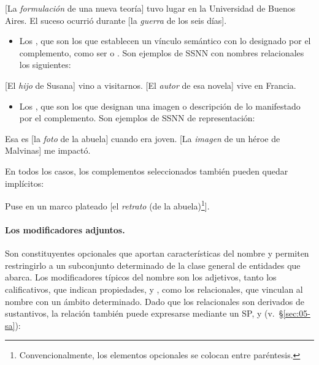 \begin{exe}
  \ex\label{ex:05-lugar} {}[La \textit{formulación} de una nueva teoría] tuvo
      lugar en la Universidad de Buenos Aires.
  \ex\label{ex:05-durante} El suceso ocurrió durante [la \textit{guerra} de los
      seis días].
\end{exe}

\begin{itemize}
  \item Los , que son los que establecen un vínculo
        semántico con lo designado por el complemento, como ser  o . Son ejemplos de SSNN con nombres relacionales los
        siguientes:
\end{itemize}

\begin{exe}
  \ex {}[El \textit{hijo} de Susana] vino a visitarnos.
  \ex {}[El \textit{autor} de esa novela] vive en Francia.
\end{exe}

\begin{itemize}
  \item Los , que son los que designan una
        imagen o descripción de lo manifestado por el complemento. Son ejemplos
        de SSNN de representación:
\end{itemize}

\begin{exe}
  \ex Esa es [la \textit{foto} de la abuela] cuando era joven.
  \ex {}[La \textit{imagen} de un héroe de Malvinas] me impactó.
\end{exe}

En todos los casos, los complementos seleccionados también pueden quedar
implícitos:

\begin{exe}
  \ex Puse en un marco plateado [el \textit{retrato} (de la
      abuela)\footnote{Convencionalmente, los elementos opcionales se colocan
      entre paréntesis.}].
\end{exe}

\paragraph{Los modificadores adjuntos.} Son constituyentes opcionales que
aportan características del nombre y permiten restringirlo a un subconjunto
determinado de la clase general de entidades que abarca. Los modificadores
típicos del nombre son los adjetivos, tanto los calificativos, que indican
propiedades,  y , como los
relacionales, que vinculan al nombre con un ámbito determinado. Dado que los
relacionales son derivados de sustantivos, la relación también puede expresarse
mediante un SP,  y 
(v.~§\ref{sec:05-sa}):

